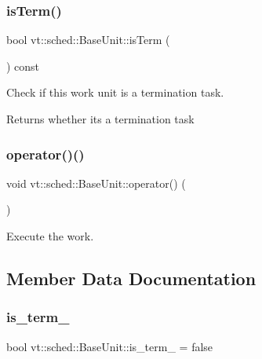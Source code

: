 \subsubsection{\texorpdfstring{is\+Term()}{isTerm()}}
{\footnotesize\ttfamily bool vt\+::sched\+::\+Base\+Unit\+::is\+Term (\begin{DoxyParamCaption}{ }\end{DoxyParamCaption}) const\hspace{0.3cm}{\ttfamily [inline]}}



Check if this work unit is a termination task. 

\begin{DoxyReturn}{Returns}
whether it\textquotesingle{}s a termination task 
\end{DoxyReturn}
\mbox{\label{structvt_1_1sched_1_1_base_unit_accbb274436789b6b8ed99c3ee42a8114}} 
\subsubsection{\texorpdfstring{operator()()}{operator()()}}
{\footnotesize\ttfamily void vt\+::sched\+::\+Base\+Unit\+::operator() (\begin{DoxyParamCaption}{ }\end{DoxyParamCaption})\hspace{0.3cm}{\ttfamily [inline]}}



Execute the work. 



\subsection{Member Data Documentation}
\mbox{\label{structvt_1_1sched_1_1_base_unit_a5aab7332c91c6ccdc76bdb55de9cc502}} 
\subsubsection{\texorpdfstring{is\+\_\+term\+\_\+}{is\_term\_}}
{\footnotesize\ttfamily bool vt\+::sched\+::\+Base\+Unit\+::is\+\_\+term\+\_\+ = false\hspace{0.3cm}{\ttfamily [protected]}}

